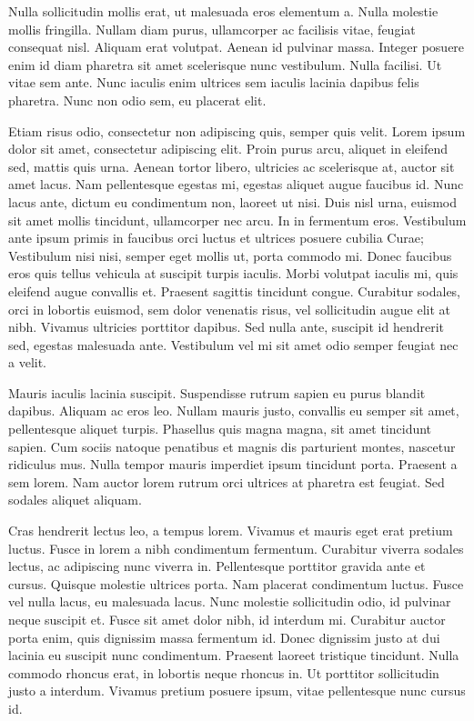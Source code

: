 Nulla sollicitudin mollis erat, ut malesuada eros elementum a.
Nulla molestie mollis fringilla.
Nullam diam purus, ullamcorper ac facilisis vitae, feugiat consequat nisl.
Aliquam erat volutpat.
Aenean id pulvinar massa.
Integer posuere enim id diam pharetra sit amet scelerisque nunc vestibulum.
Nulla facilisi.
Ut vitae sem ante.
Nunc iaculis enim ultrices sem iaculis lacinia dapibus felis pharetra.
Nunc non odio sem, eu placerat elit.

Etiam risus odio, consectetur non adipiscing quis, semper quis velit.
Lorem ipsum dolor sit amet, consectetur adipiscing elit.
Proin purus arcu, aliquet in eleifend sed, mattis quis urna.
Aenean tortor libero, ultricies ac scelerisque at, auctor sit amet lacus.
Nam pellentesque egestas mi, egestas aliquet augue faucibus id.
Nunc lacus ante, dictum eu condimentum non, laoreet ut nisi.
Duis nisl urna, euismod sit amet mollis tincidunt, ullamcorper nec arcu.
In in fermentum eros.
Vestibulum ante ipsum primis in faucibus orci luctus et ultrices posuere cubilia Curae; Vestibulum nisi nisi, semper eget mollis ut, porta commodo mi.
Donec faucibus eros quis tellus vehicula at suscipit turpis iaculis.
Morbi volutpat iaculis mi, quis eleifend augue convallis et.
Praesent sagittis tincidunt congue.
Curabitur sodales, orci in lobortis euismod, sem dolor venenatis risus, vel sollicitudin augue elit at nibh.
Vivamus ultricies porttitor dapibus.
Sed nulla ante, suscipit id hendrerit sed, egestas malesuada ante.
Vestibulum vel mi sit amet odio semper feugiat nec a velit.

Mauris iaculis lacinia suscipit.
Suspendisse rutrum sapien eu purus blandit dapibus.
Aliquam ac eros leo.
Nullam mauris justo, convallis eu semper sit amet, pellentesque aliquet turpis.
Phasellus quis magna magna, sit amet tincidunt sapien.
Cum sociis natoque penatibus et magnis dis parturient montes, nascetur ridiculus mus.
Nulla tempor mauris imperdiet ipsum tincidunt porta.
Praesent a sem lorem.
Nam auctor lorem rutrum orci ultrices at pharetra est feugiat.
Sed sodales aliquet aliquam.

Cras hendrerit lectus leo, a tempus lorem.
Vivamus et mauris eget erat pretium luctus.
Fusce in lorem a nibh condimentum fermentum.
Curabitur viverra sodales lectus, ac adipiscing nunc viverra in.
Pellentesque porttitor gravida ante et cursus.
Quisque molestie ultrices porta.
Nam placerat condimentum luctus.
Fusce vel nulla lacus, eu malesuada lacus.
Nunc molestie sollicitudin odio, id pulvinar neque suscipit et.
Fusce sit amet dolor nibh, id interdum mi.
Curabitur auctor porta enim, quis dignissim massa fermentum id.
Donec dignissim justo at dui lacinia eu suscipit nunc condimentum.
Praesent laoreet tristique tincidunt.
Nulla commodo rhoncus erat, in lobortis neque rhoncus in.
Ut porttitor sollicitudin justo a interdum.
Vivamus pretium posuere ipsum, vitae pellentesque nunc cursus id.

